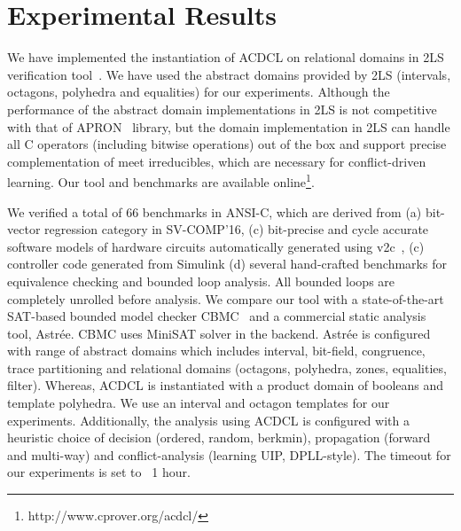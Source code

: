 

\section{Experimental Results}
We have implemented the instantiation of ACDCL on relational domains
in 2LS verification tool~\cite{2ls}.  We have used the abstract domains
provided by 2LS (intervals, octagons, polyhedra and equalities) for our
experiments. Although the performance of the abstract domain implementations 
in 2LS is not competitive with that of APRON~\cite{apron} library, but 
the domain implementation in 2LS can handle all C operators 
(including bitwise operations) out of the box and support precise
complementation of meet irreducibles, which are necessary for conflict-driven 
learning. Our tool and benchmarks are available online\footnote{http://www.cprover.org/acdcl/}.

We verified a total of 66 benchmarks in ANSI-C, which are derived from 
(a) bit-vector regression category in SV-COMP'16, (c) bit-precise and 
cycle accurate software models of hardware circuits automatically 
generated using v2c~\cite{mtk2016}, (c) controller code generated 
from Simulink (d) several hand-crafted benchmarks for equivalence 
checking and bounded loop analysis.  All bounded loops are completely 
unrolled before analysis.  We compare our tool with a state-of-the-art 
SAT-based bounded model checker CBMC~\cite{cbmc} and a commercial 
static analysis tool, Astr{\'e}e.  CBMC uses MiniSAT solver in the backend.  
Astr{\'e}e is configured with range of abstract domains which includes 
interval, bit-field, congruence, trace partitioning and relational 
domains (octagons, polyhedra, zones, equalities, filter).  Whereas, 
ACDCL is instantiated with a product domain of booleans and template 
polyhedra.  We use an interval and octagon templates for our
experiments.  Additionally, the analysis using ACDCL is configured with 
a heuristic choice of decision (ordered, random, berkmin), 
propagation (forward and multi-way) and conflict-analysis (learning UIP,
DPLL-style).  The timeout for our experiments is set to ~1 hour. 
%
